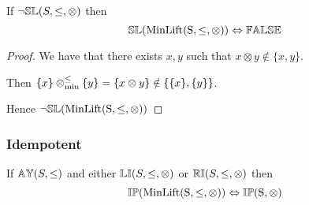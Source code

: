 \documentclass[../Summary.tex]{subfiles}
\begin{document}
\begin{theorem} \label{thm:minlift_sl}
If $\neg{\mathbb{SL}}(S,\leq,\otimes)$ then
\begin{equation*}
{\mathbb{SL}}(\mathrm{MinLift(S,\leq,\otimes)}) \Leftrightarrow {\mathbb{FALSE}}
\end{equation*}
\end{theorem}

\begin{proof}

\vspace{0.5em}

We have that there exists $x, y$ such that $x \otimes y \notin \{x , y\}$.

\vspace{0.5em}

Then $\{ x \} \mathbin{\otimes_{\min}^{\leq}} \{ y \} = \{ x \otimes y \} \notin \{ \{ x \}, \{ y \}\}$.

\vspace{0.5em}

Hence $\neg {\mathbb{SL}}(\mathrm{MinLift(S,\leq,\otimes)})$
\end{proof}





\subsubsection{Idempotent}

\begin{theorem} \label{thm:minlift_ip}
If ${\mathbb{AY}}(S,\leq)$ and either ${\mathbb{LI}}(S,\leq,\otimes)$ or ${\mathbb{RI}}(S,\leq,\otimes)$ then
\begin{equation*}
{\mathbb{IP}}(\mathrm{MinLift(S,\leq,\otimes)}) \Leftrightarrow {\mathbb{IP}}(\mathrm{S,\otimes})
\end{equation*}
\end{theorem}
\end{document}
